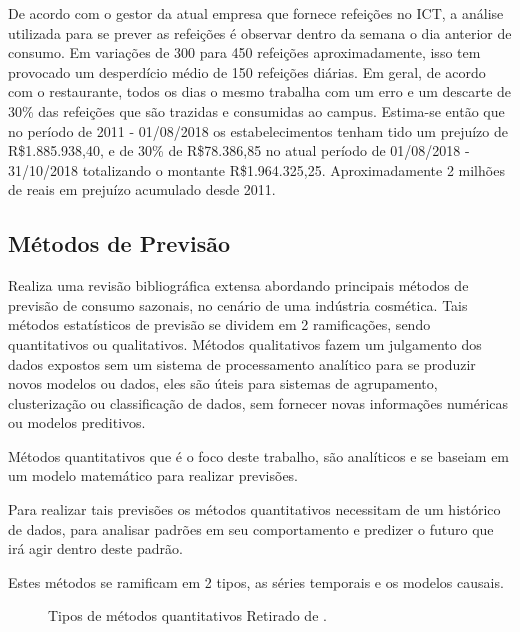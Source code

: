 \documentclass[	12pt, Times, openright, twoside, a4paper, english, brazil]{abntex2}
\begin{document}
De acordo com o gestor da atual empresa que fornece refeições no ICT, a análise utilizada para se prever as refeições é observar dentro da semana o dia anterior de consumo. Em variações de 300 para 450 refeições aproximadamente, isso tem provocado um desperdício médio de 150 refeições diárias. Em geral, de acordo com o restaurante, todos os dias o mesmo trabalha com um erro e um descarte de 30\% das refeições que são trazidas e consumidas ao campus. Estima-se então que no período de 2011 - 01/08/2018 os estabelecimentos tenham tido um prejuízo de R\$1.885.938,40, e de 30\% de R\$78.386,85 no atual período de 01/08/2018 - 31/10/2018 totalizando o montante  R\$1.964.325,25. Aproximadamente 2 milhões de reais em prejuízo acumulado desde 2011.

\subsection{Métodos de Previsão} 

\cite{Junior2007} Realiza uma revisão bibliográfica extensa abordando principais métodos de previsão de consumo sazonais, no cenário de uma indústria cosmética. Tais métodos estatísticos de previsão se dividem em 2 ramificações, sendo quantitativos ou qualitativos. Métodos qualitativos fazem um julgamento dos dados expostos sem um sistema de processamento analítico para se produzir novos modelos ou dados, eles são úteis para sistemas de agrupamento, clusterização ou classificação de dados, sem fornecer novas informações numéricas ou modelos preditivos.

Métodos quantitativos que é o foco deste trabalho, são analíticos e se baseiam em um modelo matemático para realizar previsões. 

Para realizar tais previsões os métodos quantitativos necessitam de um histórico de dados, para analisar padrões em seu comportamento e predizer o futuro que irá agir dentro deste padrão.

Estes métodos se ramificam em 2 tipos, as séries temporais e os modelos causais.
\begin{figure}[!ht]
	\caption{Tipos de métodos quantitativos Retirado de \cite{Junior2007}.\label{fig:metodosQuantitativos}}
\end{figure}
\end{document}
